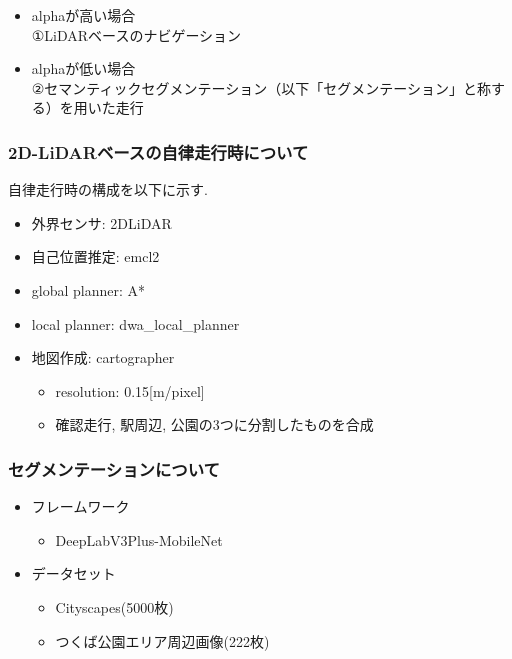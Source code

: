 \documentclass[uplatex, twocolumn, 9pt]{jsproceedings}
\begin{document}
\newpage

\begin{itemize}
  \item alphaが高い場合\\
  ①LiDARベースのナビゲーション
  \item alphaが低い場合\\
  ②セマンティックセグメンテーション（以下「セグメンテーション」と称する）を用いた走行
\end{itemize}

\subsubsection{2D-LiDARベースの自律走行時について}
自律走行時の構成を以下に示す.
\begin{itemize}
  \item 外界センサ: 2DLiDAR
  \item 自己位置推定: emcl2
  \item global planner: A*
  \item local planner: dwa\_local\_planner
  \item 地図作成: cartographer
  \begin{itemize}
    \item resolution: 0.15[m/pixel]
    \item 確認走行, 駅周辺, 公園の3つに分割したものを合成
  \end{itemize}
\end{itemize}

\subsubsection{セグメンテーションについて}
\begin{itemize}
  \item フレームワーク
  \begin{itemize}
    \item DeepLabV3Plus-MobileNet
  \end{itemize}
\end{itemize}
\begin{itemize}
  \item データセット
  \begin{itemize}
    \item Cityscapes(5000枚)
    \item つくば公園エリア周辺画像(222枚)
  \end{itemize}
\end{itemize}
\end{document}
